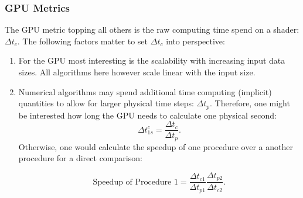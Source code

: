\documentclass[m,times]{cgMA}
\begin{document}
\subsubsection{GPU Metrics}\label{sec:metrics}
The GPU metric topping all others is the raw computing time spend on a shader: $\Delta t_c$. The following factors matter to set $\Delta t_c$ into perspective:
\begin{enumerate}
  \item For the GPU most interesting is the scalability with increasing input data sizes. All algorithms here however scale linear with the input size.
  \item \label{it:speedup}Numerical algorithms may spend additional time computing (implicit) quantities to allow for larger physical time steps: $\Delta t_p$. Therefore, one might be interested how long the GPU needs to calculate one physical second:
    \begin{equation}
    \Delta t^c_{1s} = \frac{\Delta t_c}{\Delta t_p}.
    \end{equation}
    Otherwise, one would calculate the speedup of one procedure over a another procedure for a direct comparison:

    \begin{equation}
      \text{Speedup of Procedure 1} = \frac{\Delta t_{c1}}{\Delta t_{p1}} \frac{\Delta t_{p2}}{\Delta t_{c2}}.
    \end{equation}
\end{enumerate}
\end{document}
